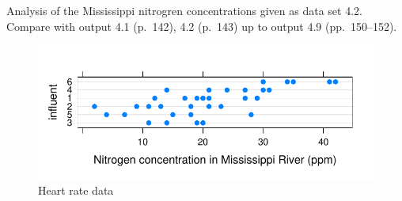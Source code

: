 \documentclass[12pt]{article}
\begin{document}
Analysis of the Mississippi nitrogren concentrations given as data set
4.2.  Compare with output 4.1 (p.~142), 4.2 (p.~143) up to output 4.9
(pp.~150--152). 
\begin{figure}[tbp]
  \centering
  \includegraphics{figs/f-mississippi1}
  \caption{Heart rate data}
  \label{fig:mississippi1}
\end{figure}
\end{document}
